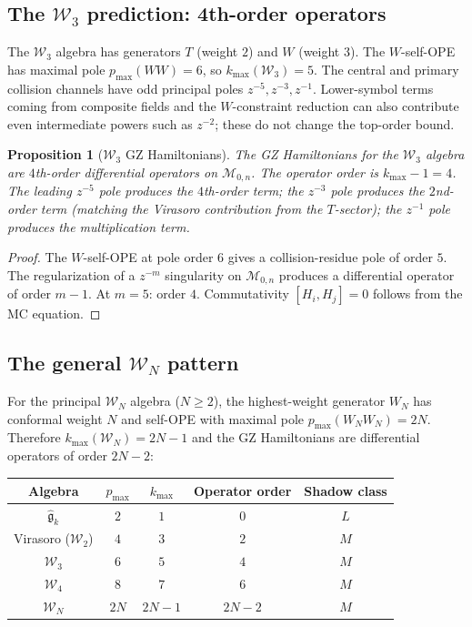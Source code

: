 \documentclass[11pt]{article}
\theoremstyle{plain}
\newtheorem{proposition}[theorem]{Proposition}
\theoremstyle{definition}
\theoremstyle{remark}
\newcommand{\fg}{\mathfrak{g}}
\newcommand{\cW}{\mathcal{W}}
\numberwithin{equation}{section}
\begin{document}
\subsection{The $\cW_3$ prediction: 4th-order operators}

The $\cW_3$ algebra has generators $T$ (weight $2$) and $W$
(weight $3$). The $W$-self-OPE has maximal pole $p_{\max}(WW) = 6$,
so $k_{\max}(\cW_3) = 5$. The central and primary collision channels
have odd principal poles \(z^{-5},z^{-3},z^{-1}\). Lower-symbol terms
coming from composite fields and the \(W\)-constraint reduction can
also contribute even intermediate powers such as \(z^{-2}\); these do
not change the top-order bound.

\begin{proposition}[$\cW_3$ GZ Hamiltonians]
\label{prop:w3-gz-hamiltonians}
The GZ Hamiltonians for the $\cW_3$ algebra are $4$th-order
differential operators on $\mathcal{M}_{0,n}$. The operator order
is $k_{\max} - 1 = 4$. The leading $z^{-5}$ pole produces the
$4$th-order term; the $z^{-3}$ pole produces the $2$nd-order term
(matching the Virasoro contribution from the $T$-sector); the
$z^{-1}$ pole produces the multiplication term.
\end{proposition}

\begin{proof}
The $W$-self-OPE at pole order $6$ gives a collision-residue pole
of order $5$. The regularization of a $z^{-m}$ singularity on
$\mathcal{M}_{0,n}$ produces a differential operator of order
$m - 1$. At $m = 5$: order $4$. Commutativity
$[H_i, H_j] = 0$ follows from the MC equation.
\end{proof}

\subsection{The general $\cW_N$ pattern}

For the principal $\cW_N$ algebra ($N \geq 2$), the highest-weight
generator $W_N$ has conformal weight $N$ and self-OPE with maximal
pole $p_{\max}(W_N W_N) = 2N$. Therefore $k_{\max}(\cW_N) = 2N-1$
and the GZ Hamiltonians are differential operators of order $2N-2$:

\begin{center}
\renewcommand{\arraystretch}{1.3}
\begin{tabular}{ccccc}
\toprule
Algebra & $p_{\max}$ & $k_{\max}$ & Operator order
 & Shadow class \\
\midrule
$\widehat{\fg}_k$ & $2$ & $1$ & $0$ & $L$ \\
Virasoro ($\cW_2$) & $4$ & $3$ & $2$ & $M$ \\
$\cW_3$ & $6$ & $5$ & $4$ & $M$ \\
$\cW_4$ & $8$ & $7$ & $6$ & $M$ \\
$\cW_N$ & $2N$ & $2N-1$ & $2N-2$ & $M$ \\
\bottomrule
\end{tabular}
\end{center}
\end{document}
